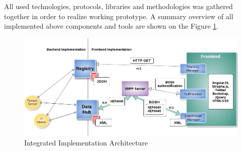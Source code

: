 All used technologies, protocols, libraries and methodologies was gathered together in order to realize working prototype. A summary overview of all implemented above components and tools are shown on the Figure \ref{img:summary}.
\begin{figure}[H]
\centering
\includegraphics[scale=0.5]{images/ch5Summary.png}   
\caption[Implementation Architecture]{Integrated Implementation Architecture}  
\label{img:summary}                       
\end{figure}

